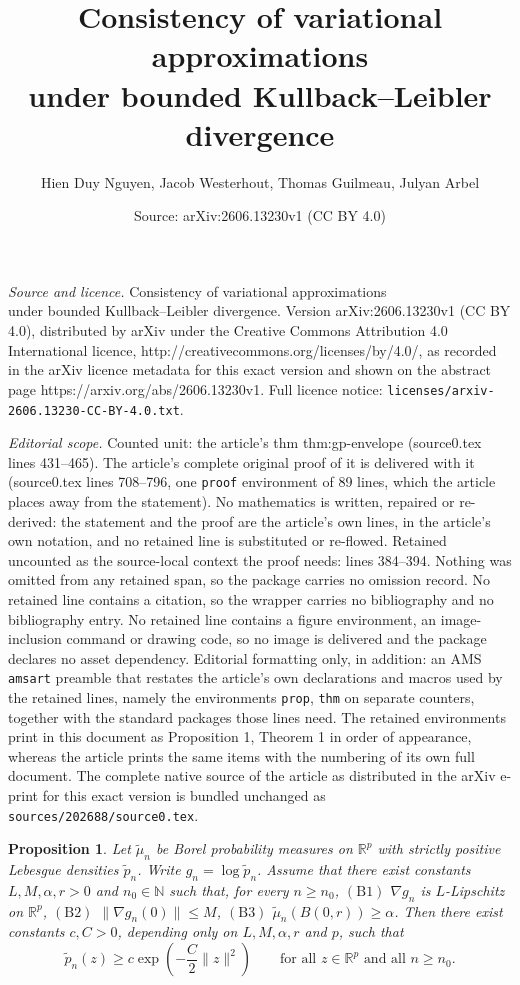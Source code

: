 \documentclass[10pt,a4paper]{amsart}
\title{Consistency of variational approximations\\ under bounded Kullback--Leibler divergence}
\author{Hien Duy Nguyen, Jacob Westerhout, Thomas Guilmeau, Julyan Arbel}
\date{Source: arXiv:2606.13230v1 (CC BY 4.0)}
\newtheorem{prop}{Proposition}
\begin{document}
\maketitle

\noindent\emph{Source and licence.} Consistency of variational approximations\\ under bounded Kullback--Leibler divergence. Version arXiv:2606.13230v1 (CC BY 4.0), distributed by arXiv under the Creative Commons Attribution 4.0 International licence, http://creativecommons.org/licenses/by/4.0/, as recorded in the arXiv licence metadata for this exact version and shown on the abstract page https://arxiv.org/abs/2606.13230v1. Full licence notice: \texttt{licenses/arxiv-2606.13230-CC-BY-4.0.txt}.\par\smallskip

\noindent\textit{Editorial scope.} Counted unit: the article's thm thm:gp-envelope (source0.tex lines 431--465). The article's complete original proof of it is delivered with it (source0.tex lines 708--796, one \texttt{proof} environment of 89 lines, which the article places away from the statement). No mathematics is written, repaired or re-derived: the statement and the proof are the article's own lines, in the article's own notation, and no retained line is substituted or re-flowed.  Retained uncounted as the source-local context the proof needs: lines 384--394.  Nothing was omitted from any retained span, so the package carries no omission record.  No retained line contains a citation, so the wrapper carries no bibliography and no bibliography entry.  No retained line contains a figure environment, an image-inclusion command or drawing code, so no image is delivered and the package declares no asset dependency.  Editorial formatting only, in addition: an AMS \texttt{amsart} preamble that restates the article's own declarations and macros used by the retained lines, namely the environments \texttt{prop}, \texttt{thm} on separate counters, together with the standard packages those lines need.  The retained environments print in this document as Proposition 1, Theorem 1 in order of appearance, whereas the article prints the same items with the numbering of its own full document.  The complete native source of the article as distributed in the arXiv e-print for this exact version is bundled unchanged as \texttt{sources/202688/source0.tex}.
\begin{prop} \label{prop:quadratic-envelope} Let $\tilde\mu_{n}$ be Borel
probability measures on $\mathbb{R}^{p}$ with strictly positive Lebesgue
densities $\tilde p_{n}$. Write $g_{n}=\log \tilde p_{n}$. Assume that there exist
constants $L,M,\alpha,r>0$ and $n_{0}\in\mathbb{N}$ such that, for
every $n\ge n_{0}$, $\mathrm{(B1)}$  $\nabla g_{n}$ is $L$-Lipschitz on $\mathbb{R}^{p}$, $\mathrm{(B2)}$  $\|\nabla g_{n}(0)\|\le M$, $\mathrm{(B3)}$ $\tilde\mu_{n}(B(0,r))\ge\alpha$.
Then there exist constants $c,C>0$, depending only on $L,M,\alpha,r$
and $p$, such that
\[
\tilde p_{n}(z)\ge c\exp\left(-\frac{C}{2}\|z\|^{2}\right)\qquad\text{for all }z\in\mathbb{R}^{p}\text{ and all }n\ge n_{0}.
\]
\end{prop}
\end{document}
